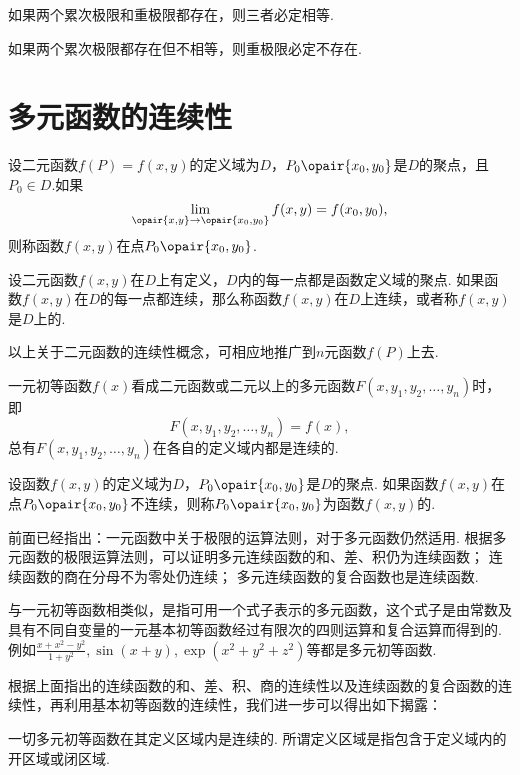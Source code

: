 \begin{corollary}
如果两个累次极限和重极限都存在，则三者必定相等.
\end{corollary}

\begin{corollary}
如果两个累次极限都存在但不相等，则重极限必定不存在.
\end{corollary}

\section{多元函数的连续性}
\begin{definition}
设二元函数\(f(P)=f(x,y)\)的定义域为\(D\)，\(P_0\opair{x_0,y_0}\)是\(D\)的聚点，且\(P_0 \in D\).如果\[
\lim\limits_{\opair{x,y}\to\opair{x_0,y_0}} f(x,y) = f(x_0,y_0),
\]则称函数\(f(x,y)\)在点\(P_0\opair{x_0,y_0}\).

设二元函数\(f(x,y)\)在\(D\)上有定义，\(D\)内的每一点都是函数定义域的聚点.
如果函数\(f(x,y)\)在\(D\)的每一点都连续，那么称函数\(f(x,y)\)在\(D\)上连续，或者称\(f(x,y)\)是\(D\)上的.
\end{definition}
以上关于二元函数的连续性概念，可相应地推广到\(n\)元函数\(f(P)\)上去.

一元初等函数\(f(x)\)看成二元函数或二元以上的多元函数\(F(x,y_1,y_2,\dotsc,y_n)\)时，即\[
F(x,y_1,y_2,\dotsc,y_n) = f(x),
\]总有\(F(x,y_1,y_2,\dotsc,y_n)\)在各自的定义域内都是连续的.

\begin{definition}
设函数\(f(x,y)\)的定义域为\(D\)，\(P_0\opair{x_0,y_0}\)是\(D\)的聚点.
如果函数\(f(x,y)\)在点\(P_0\opair{x_0,y_0}\)不连续，则称\(P_0\opair{x_0,y_0}\)为函数\(f(x,y)\)的.
\end{definition}

前面已经指出：一元函数中关于极限的运算法则，对于多元函数仍然适用.
根据多元函数的极限运算法则，可以证明多元连续函数的和、差、积仍为连续函数；
连续函数的商在分母不为零处仍连续；
多元连续函数的复合函数也是连续函数.

与一元初等函数相类似，是指可用一个式子表示的多元函数，这个式子是由常数及具有不同自变量的一元基本初等函数经过有限次的四则运算和复合运算而得到的.
例如\(\frac{x+x^2-y^2}{1+y^2},\sin(x+y),\exp(x^2+y^2+z^2)\)等都是多元初等函数.

根据上面指出的连续函数的和、差、积、商的连续性以及连续函数的复合函数的连续性，再利用基本初等函数的连续性，我们进一步可以得出如下揭露：

一切多元初等函数在其定义区域内是连续的.
所谓定义区域是指包含于定义域内的开区域或闭区域.


